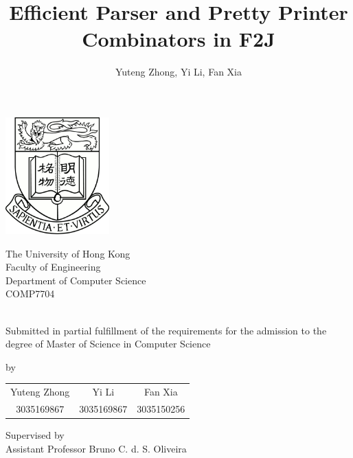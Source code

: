 \documentclass[12pt,a4paper,oneside]{report}
\title{Efficient Parser and Pretty Printer Combinators in F2J}
\author{Yuteng Zhong, Yi Li, Fan Xia}
\begin{document}
\pagestyle{empty}

\makeatletter
\begin{titlepage}
    \begin{center}
        \includegraphics[width=0.3\textwidth]{imgs/HKU}

        \large
        The University of Hong Kong\\
        Faculty of Engineering\\
        Department of Computer Science\\

        \vfill
        \vspace{0.5cm}
        COMP7704\\

        \Huge
        \@title\\

        \vfill

        \normalsize
        Submitted in partial fulfillment of the requirements for the admission to the degree of Master of Science in Computer Science

        \vfill

        \normalsize
        by\\
        \vspace{0.5cm}

        \begin{tabular}{ccc}
        Yuteng Zhong & Yi Li & Fan Xia\\
        3035169867 & 3035169867 & 3035150256
        \end{tabular}

        \vspace{0.5cm}
        Supervised by\\
        Assistant Professor Bruno C. d. S. Oliveira\\

        \vspace{0.5cm}
        \normalsize
        \@date
    \end{center}
\end{titlepage}
\newpage
\end{document}
